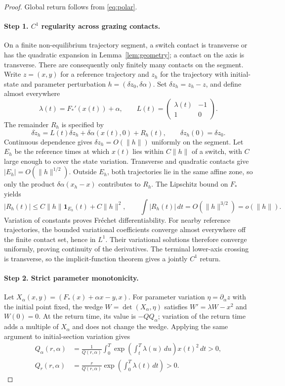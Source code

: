 \documentclass[11pt]{article}
\theoremstyle{remark}
\begin{document}
\begin{proof}
Global return follows from \eqref{eq:polar}.

\paragraph{Step 1. \(C^1\) regularity across grazing contacts.}
On a finite non-equilibrium trajectory
segment, a switch contact is transverse or has the quadratic expansion
in Lemma~\ref{lem:geometry}; a contact on the axis is transverse.
There are consequently only finitely many contacts on the segment.
Write \(z=(x,y)\) for a reference trajectory and \(z_h\) for the
trajectory with initial-state and parameter perturbation
\(h=(\delta z_0,\delta\alpha)\).  Set \(\delta z_h=z_h-z\), and define
almost everywhere
\[
 \lambda(t)=F_*'(x(t))+\alpha,\qquad
 L(t)=\begin{pmatrix}\lambda(t)&-1\\1&0\end{pmatrix}.
\]
The remainder \(R_h\) is specified by
\[
 \delta\dot z_h=L(t)\delta z_h+\delta\alpha(x(t),0)+R_h(t),\qquad
 \delta z_h(0)=\delta z_0.
\]
Continuous dependence gives \(\delta z_h=O(\|h\|)\) uniformly on the
segment.  Let \(E_h\) be the reference times at which \(x(t)\) lies
within \(C\|h\|\) of a switch, with \(C\) large enough to cover the
state variation.  Transverse and quadratic contacts give
\(|E_h|=O(\|h\|^{1/2})\).  Outside \(E_h\), both trajectories lie in
the same affine zone, so only the product
\(\delta\alpha(x_h-x)\) contributes to \(R_h\).  The Lipschitz bound
on \(F_*\) yields
\[
 |R_h(t)|\le C\|h\|\mathbf1_{E_h}(t)+C\|h\|^2,
 \qquad \int|R_h(t)|\,dt=O(\|h\|^{3/2})=o(\|h\|).
\]
Variation of constants proves Fr\'echet differentiability.  For nearby
reference trajectories, the bounded variational coefficients converge
almost everywhere off the finite contact set, hence in \(L^1\).
Their variational solutions therefore converge uniformly, proving
continuity of the derivatives.  The terminal lower-axis crossing is
transverse, so the implicit-function theorem gives a jointly \(C^1\)
return.

\paragraph{Step 2. Strict parameter monotonicity.}
Let \(X_\alpha(x,y)=(F_*(x)+\alpha x-y,x)\).  For parameter variation
\(\eta=\partial_\alpha z\) with the initial point fixed, the wedge
\(W=\det(X_\alpha,\eta)\) satisfies
\(W'=\lambda W-x^2\) and \(W(0)=0\).  At the return time, its value is
\(-Q Q_\alpha\); variation of the return time adds a multiple of
\(X_\alpha\) and does not change the wedge.  Applying the same argument
to initial-section variation gives
\begin{equation}\label{eq:rotation}
\begin{aligned}
 Q_\alpha(r,\alpha)&=\frac1{Q(r,\alpha)}
 \int_0^T\exp\!\left(\int_t^T\lambda(u)\,du\right)x(t)^2\,dt>0,\\
 Q_r(r,\alpha)&=\frac r{Q(r,\alpha)}
 \exp\!\left(\int_0^T\lambda(t)\,dt\right)>0.
\end{aligned}
\end{equation}


\end{proof}
\end{document}
